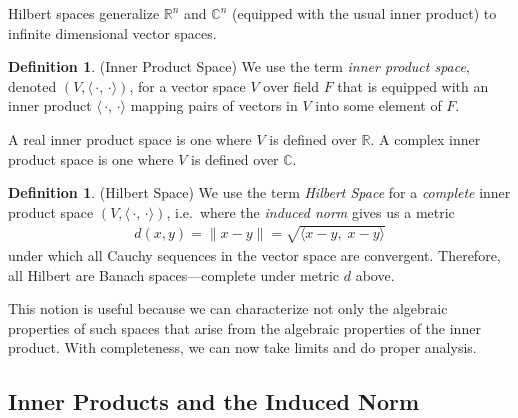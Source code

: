 \documentclass[12pt]{book}
\numberwithin{equation}{section} %
\theoremstyle{plain}
\theoremstyle{definition}
\newtheorem{defn}[thm]{Definition}
\theoremstyle{remark}
\newcommand{\R}{\mathbb{R}}
\newcommand{\C}{\mathbb{C}}
\begin{document}
Hilbert spaces generalize $\R^n$ and $\C^n$ (equipped with the usual
inner product) to infinite dimensional vector spaces.

\begin{defn}(Inner Product Space)
We use the term \emph{inner product space}, denoted
$(V,\langle\,\cdot,\,\cdot\rangle)$,
for a vector space $V$ over field $F$ that is equipped with an inner
product
$\langle\,\cdot,\,\cdot\rangle$
mapping pairs of vectors in $V$ into some element of $F$.

A real inner product space is one where $V$ is defined over $\R$.
A complex inner product space is one where $V$ is defined over $\C$.
\end{defn}


\begin{defn}(Hilbert Space)
We use the term \emph{Hilbert Space} for a \emph{complete} inner product
space $(V,\langle\,\cdot,\,\cdot\rangle)$,
i.e.\ where the \emph{induced norm} gives us a metric
\begin{align*}
  d(x,y) = \lVert x-y\rVert
  = \sqrt{\langle x-y,\; x-y\rangle}
\end{align*}
under which all Cauchy sequences in the vector space are convergent.
Therefore, all Hilbert are Banach spaces---complete under metric $d$
above.

This notion is useful because we can characterize not only the algebraic
properties of such spaces that arise from the algebraic properties of
the inner product.
With completeness, we can now take limits and do proper analysis.
\end{defn}



\subsection{Inner Products and the Induced Norm}
\end{document}
